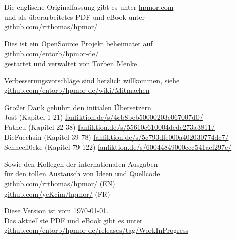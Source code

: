\begin{center}
{\vspace*{1\baselineskip}
Die englische Originalfassung gibt es unter {\small\href{https://hpmor.com}{hpmor.com}}\\
und als überarbeitetes PDF und eBook unter\\
{\small\href{https://github.com/rrthomas/hpmor/}{github.com/rrthomas/hpmor/}}\\
}
\end{center}


\newpage
\begin{center}
\noindent
\vfill
Dies ist ein OpenSource Projekt beheimatet auf \\
{\small\href{https://github.com/entorb/hpmor-de/}{github.com/entorb/hpmor-de/}}\\
gestartet und verwaltet von \href{https://entorb.net}{Torben Menke}

\vspace*{1\baselineskip}
Verbesserungsvorschläge sind herzlich willkommen, siehe\\
{\small\href{https://github.com/entorb/hpmor-de/wiki/Mitmachen}{github.com/entorb/hpmor-de/wiki/Mitmachen}}

\vspace*{1\baselineskip}
Großer Dank gebührt den initialen Übersetzern\\
Jost (Kapitel 1-21) {\small\href{https://www.fanfiktion.de/s/4cb8beb50000203e067007d0/}{fanfiktion.de/s/4cb8beb50000203e067007d0/}}\\
Patneu (Kapitel 22-38) {\small\href{https://www.fanfiktion.de/s/55610c610004dede273a3811/}{fanfiktion.de/s/55610c610004dede273a3811/}}\\
DieFuechsin (Kapitel 39-78) {\small\href{https://www.fanfiktion.de/s/5c793dfe000a402030774dc7/}{fanfiktion.de/s/5c793dfe000a402030774dc7/}}\\
Schneefl0cke (Kapitel 79-122) {\small\href{https://www.fanfiktion.de/s/60044849000ccc541aef297e/}{fanfiktion.de/s/60044849000ccc541aef297e/}}

\vspace*{1\baselineskip}
Sowie den Kollegen der internationalen Ausgaben\\
für den tollen Austausch von Ideen und Quellcode\\
{\small\href{https://github.com/rrthomas/hpmor/}{github.com/rrthomas/hpmor/}} (EN)\\
{\small\href{https://github.com/yeKcim/hpmor/}{github.com/yeKcim/hpmor/}} (FR)

\vspace*{1\baselineskip}
Diese Version ist vom \today{}.\\
Das aktuellste PDF und eBook gibt es unter\\
{\small\href{https://github.com/entorb/hpmor-de/releases/tag/WorkInProgress}{github.com/entorb/hpmor-de/releases/tag/WorkInProgress}}\\
\end{center}

